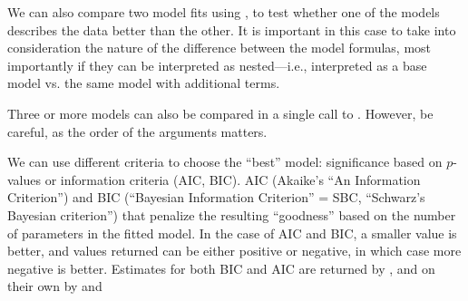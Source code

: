\documentclass[krantz2]{krantz}\usepackage{knitr}
\begin{document}
\begin{playground}
We can also compare two model fits using , to test whether one of the models describes the data better than the other. It is important in this case to take into consideration the nature of the difference between the model formulas, most importantly if they can be interpreted as nested---i.e., interpreted as a base model vs. the same model with additional terms.

\begin{knitrout}\footnotesize
{}\color{fgcolor}\begin{kframe}
\begin{alltt}
\end{alltt}
\end{kframe}
\end{knitrout}

Three or more models can also be compared in a single call to . However, be careful, as the order of the arguments matters.

\begin{knitrout}\footnotesize
{}\color{fgcolor}\begin{kframe}
\begin{alltt}
\end{alltt}
\end{kframe}
\end{knitrout}

\label{par:stats:AIC}%
We%
%
 can use different criteria to choose the ``best'' model: significance based on $p$-values or information criteria (AIC, BIC). AIC (Akaike's ``An Information Criterion'') and BIC (``Bayesian Information Criterion'' = SBC, ``Schwarz's Bayesian criterion'') that penalize the resulting ``goodness'' based on the number of parameters in the fitted model. In the case of AIC and BIC, a smaller value is better, and values returned can be either positive or negative, in which case more negative is better. Estimates for both BIC and AIC are returned by , and on their own by  and 


\end{playground}
\end{document}
